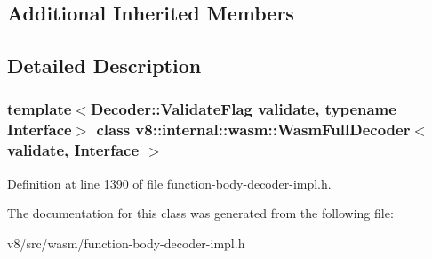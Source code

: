 \subsection*{Additional Inherited Members}


\subsection{Detailed Description}
\subsubsection*{template$<$Decoder\+::\+Validate\+Flag validate, typename Interface$>$\newline
class v8\+::internal\+::wasm\+::\+Wasm\+Full\+Decoder$<$ validate, Interface $>$}



Definition at line 1390 of file function-\/body-\/decoder-\/impl.\+h.



The documentation for this class was generated from the following file\+:\begin{DoxyCompactItemize}
\item 
v8/src/wasm/function-\/body-\/decoder-\/impl.\+h\end{DoxyCompactItemize}
